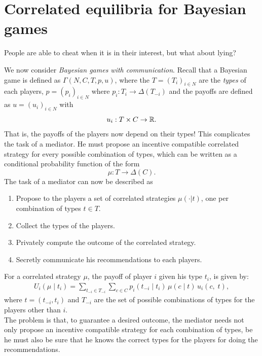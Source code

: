 \section{Correlated equilibria for Bayesian games}
\label{ch5:sec:bay}

People are able to cheat when it is in their interest, but what about lying?

We now consider \emph{Bayesian games with communication}. Recall that a Bayesian game is defined as $\Gamma(N,C,T,p,u)$, where the $T = (T_i)_{i \in N}$ are the \emph{types} of each players, 
$p = (p_{i})_{i \in N}$ where $p_i : T_i \rightarrow \Delta(T_{-i})$ and the payoffs are defined as $u = (u_i)_{i \in N}$ with
$$u _i : T \times C \rightarrow \mathbb{R}. $$
That is, the payoffs of the players now depend on their types! 
This complicates the task of a mediator. He must propose an incentive compatible correlated strategy for every possible combination of types, which can be written as a conditional probability function of the form
$$ \mu : T \rightarrow \Delta(C).$$ 
The task of a mediator can now be described as 
\begin{enumerate}
\item Propose to the players a set of correlated strategies $\mu(\cdot | t)$, one per combination of types $t \in T$. 
\item Collect the types of the players.
\item Privately compute the outcome of the correlated strategy.
\item Secretly communicate his recommendations to each players.
\end{enumerate}

For a correlated strategy $\mu$, the payoff of player $i$ given his type $t_i$, is given by:
\begin{align*}
	U_i(\mu \; | \; t_i) = \sum_{t_{-i} \in T_{-i}} \sum_{c \in C} p_i(t_{-i} \; | \; t_i) \, \mu(c \; | \; t) \, u_i(c, \; t),
\end{align*}
where $t = (t_{-i}, t_i)$ and $T_{-i}$ are the set of possible combinations of types for the  players other than $i$.\\


The problem is that,  to guarantee a desired outcome, the mediator needs not only propose an incentive compatible strategy for each combination  of types, be he must also be sure that he knows the correct types for the players for doing the recommendations.

